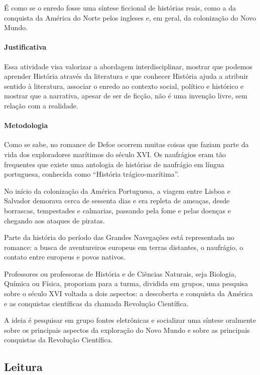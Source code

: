 \documentclass[12pt]{extarticle}
\begin{document}
É como se o enredo fosse uma síntese ficcional de histórias reais, como
a da conquista da América do Norte pelos ingleses e, em geral, da
colonização do Novo Mundo.

\paragraph{Justificativa}
Essa atividade visa valorizar a abordagem interdisciplinar, mostrar que
podemos aprender História através da literatura e que conhecer História
ajuda a atribuir sentido à literatura, associar o enredo ao contexto
social, político e histórico e mostrar que a narrativa, apesar de ser de
ficção, não é uma invenção livre, sem relação com a realidade.

\paragraph{Metodologia}
Como se sabe, no romance de Defoe ocorrem muitas coisas que faziam parte
da vida dos exploradores marítimos do século XVI. Os naufrágios eram tão
frequentes que existe uma antologia de histórias de naufrágio em língua
portuguesa, conhecida como ``História trágico-marítima''.

No início da colonização da América Portuguesa, a viagem entre Lisboa e
Salvador demorava cerca de sessenta dias e era repleta de ameaças, desde
borrascas, tempestades e calmarias, passando pela fome e pelas doenças e
chegando aos ataques de piratas.

Parte da história do período das Grandes Navegações está representada no
romance: a busca de aventureiros europeus em terras distantes, o
naufrágio, o contato entre europeus e povos nativos.

Professores ou professoras de História e de Ciências Naturais, seja
Biologia, Química ou Física, proporiam para a turma, dividida em grupos,
uma pesquisa sobre o século XVI voltada a dois aspectos: a descoberta e
conquista da América e as conquistas científicas da chamada Revolução
Científica.

A ideia é pesquisar em grupo fontes eletrônicas e socializar uma síntese
oralmente sobre os principais aspectos da exploração do Novo Mundo e
sobre as principais conquistas da Revolução Científica.



\subsection{Leitura}
\end{document}
